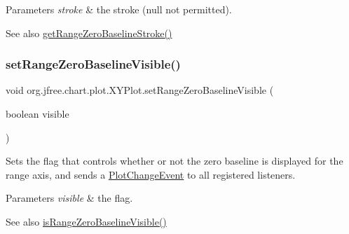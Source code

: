 \begin{DoxyParams}{Parameters}
{\em stroke} & the stroke ({\ttfamily null} not permitted).\\
\hline
\end{DoxyParams}
\begin{DoxySeeAlso}{See also}
\mbox{\hyperlink{classorg_1_1jfree_1_1chart_1_1plot_1_1_x_y_plot_a4e1e66786df0c680c395061558176470}{get\+Range\+Zero\+Baseline\+Stroke()}} 
\end{DoxySeeAlso}
\mbox{\label{classorg_1_1jfree_1_1chart_1_1plot_1_1_x_y_plot_a51560b2df5cce8d8565595c9f74981bb}} 
\subsubsection{\texorpdfstring{set\+Range\+Zero\+Baseline\+Visible()}{setRangeZeroBaselineVisible()}}
{\footnotesize\ttfamily void org.\+jfree.\+chart.\+plot.\+X\+Y\+Plot.\+set\+Range\+Zero\+Baseline\+Visible (\begin{DoxyParamCaption}\item[{boolean}]{visible }\end{DoxyParamCaption})}

Sets the flag that controls whether or not the zero baseline is displayed for the range axis, and sends a \mbox{\hyperlink{}{Plot\+Change\+Event}} to all registered listeners.


\begin{DoxyParams}{Parameters}
{\em visible} & the flag.\\
\hline
\end{DoxyParams}
\begin{DoxySeeAlso}{See also}
\mbox{\hyperlink{classorg_1_1jfree_1_1chart_1_1plot_1_1_x_y_plot_a9823b60560beb39d4a8a786d5e44bea0}{is\+Range\+Zero\+Baseline\+Visible()}} 
\end{DoxySeeAlso}
\mbox{\label{classorg_1_1jfree_1_1chart_1_1plot_1_1_x_y_plot_a7fd7dcb961248486bac19441a2e95eb7}} 
